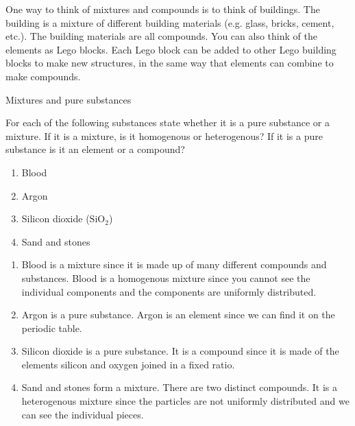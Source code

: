 \label{m38708*eip-595}One way to think of mixtures and compounds is to think of buildings. The building is a mixture of different building materials (e.g. glass, bricks, cement, etc.). The building materials are all compounds. You can also think of the elements as Lego blocks. Each Lego block can be added to other Lego building blocks to make new structures, in the same way that elements can combine to make compounds. \par \label{m38708*eip-524}\vspace{.5cm} 
      \begin{wex}
{Mixtures and pure substances}
{For each of the following substances state whether it is a pure substance or a mixture. If it is a mixture, is it homogenous or heterogenous? If it is a pure substance is it an element or a compound? 
\label{m38708*eip-id1167351497334}\begin{enumerate}[noitemsep, label=\textbf{\alph*}. ] 
\item Blood
\item Argon
\item Silicon dioxide (${\mathrm{SiO}}_{2}$)
\item Sand and stones
\end{enumerate}
  \par }
{
 
\begin{enumerate}
[noitemsep, label=\textbf{\alph*}. ]
\item Blood is a mixture since it is made up of many different compounds and substances. Blood is a homogenous mixture since you cannot see the individual components and the components are uniformly distributed.
\item Argon is a pure substance. Argon is an element since we can find it on the periodic table.
\item Silicon dioxide is a pure substance. It is a compound since it is made of the elements silicon and oxygen joined in a fixed ratio.
\item Sand and stones form a mixture. There are two distinct compounds. It is a heterogenous mixture since the particles are not uniformly distributed and we can see the individual pieces.
\end{enumerate}}
    \end{wex}

